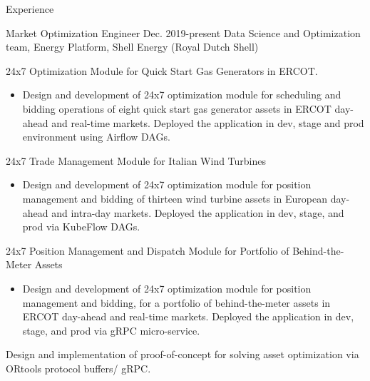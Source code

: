 \documentclass{resume} %
\begin{document}
\begin{rSection}{ Experience}

\begin{rSubsection}{Market Optimization Engineer}{ Dec. 2019-present}{ Data Science and Optimization team, Energy Platform,  Shell Energy (Royal Dutch Shell) }{}

\vspace{0.26cm}


\item[]   24x7 Optimization Module for Quick Start Gas Generators in ERCOT.

\begin{itemize}
   \item  []  Design and development of 24x7 optimization module for scheduling and bidding operations of eight quick start gas generator  assets in ERCOT day-ahead and real-time markets. Deployed the application  in dev, stage and prod environment using Airflow DAGs.
\end{itemize}


\item[] 24x7 Trade Management Module for Italian Wind Turbines

\begin{itemize}
   \item  []  Design and development of 24x7 optimization module for position management  and bidding of thirteen wind turbine  assets in European day-ahead and intra-day markets. Deployed the application in dev, stage, and prod via KubeFlow DAGs.
\end{itemize}

\item[] 24x7 Position Management and Dispatch Module for Portfolio of Behind-the-Meter Assets

\begin{itemize}
   \item  []  Design and development of 24x7 optimization module for position management and bidding, for a portfolio of behind-the-meter assets  in ERCOT day-ahead and real-time markets. Deployed the application in dev, stage, and prod via gRPC micro-service.
\end{itemize}

\item[] Design and implementation of proof-of-concept for solving asset optimization via ORtools protocol buffers/ gRPC.


\end{rSubsection}
\end{rSection}
\end{document}
